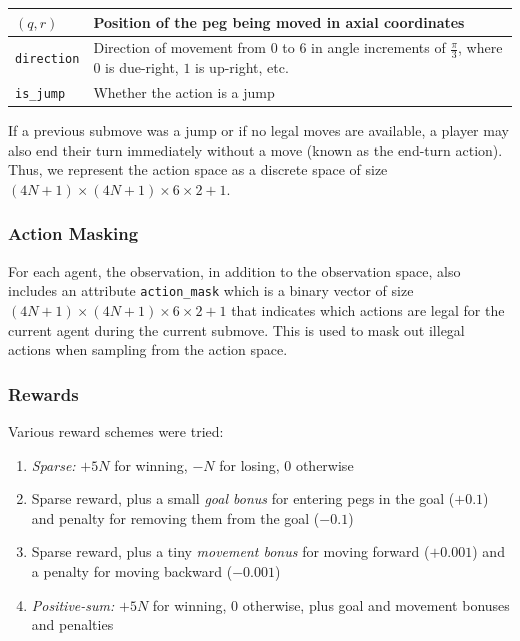 \documentclass[12pt, a4paper, twocolumn]{article}
\begin{document}
\begin{center}
  \begin{tabular}{|m{}|m{}|}
    \hline
    $(q, r)$ & Position of the peg being moved in axial coordinates \\
    \hline
    \texttt{direction} & Direction of movement from $0$ to $6$ in angle increments of $\frac{\pi}{3}$, where $0$ is due-right, $1$ is up-right, etc. \\
    \hline
    \texttt{is\_jump} & Whether the action is a jump \\
    \hline
  \end{tabular}
  \end{center}

  If a previous submove was a jump or if no legal moves are available, a player may also end their turn immediately without a move (known as the end-turn action). Thus, we represent the action space as a discrete space of size $(4N + 1) \times (4N + 1) \times 6 \times 2 + 1$.

\subsubsection{Action Masking}

For each agent, the observation, in addition to the observation space, also includes an attribute \texttt{action\_mask} which is a binary vector of size $(4N + 1) \times (4N + 1) \times 6 \times 2 + 1$ that indicates which actions are legal for the current agent during the current submove. This is used to mask out illegal actions when sampling from the action space.

\subsubsection{Rewards}

Various reward schemes were tried:

\begin{enumerate}
  \item \textit{Sparse:} $+5N$ for winning, $-N$ for losing, $0$ otherwise
  \item Sparse reward, plus a small \textit{goal bonus} for entering pegs in the goal ($+0.1$) and penalty for removing them from the goal ($-0.1$)
  \item Sparse reward, plus a tiny \textit{movement bonus} for moving forward ($+0.001$) and a penalty for moving backward ($-0.001$)
  \item \textit{Positive-sum:} $+5N$ for winning, $0$ otherwise, plus goal and movement bonuses and penalties
\end{enumerate}
\end{document}
